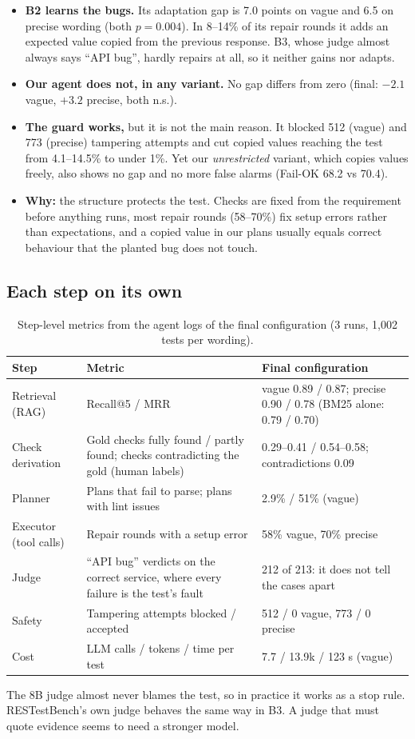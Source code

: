 \documentclass[11pt,a4paper]{article}
\begin{document}
\begin{itemize}
\item \textbf{B2 learns the bugs.} Its adaptation gap is 7.0 points on vague and 6.5 on precise wording (both $p=0.004$). In 8--14\% of its repair rounds it adds an expected value copied from the previous response. B3, whose judge almost always says ``API bug'', hardly repairs at all, so it neither gains nor adapts.
\item \textbf{Our agent does not, in any variant.} No gap differs from zero (final: $-2.1$ vague, $+3.2$ precise, both n.s.).
\item \textbf{The guard works,} but it is not the main reason. It blocked 512 (vague) and 773 (precise) tampering attempts and cut copied values reaching the test from 4.1--14.5\% to under 1\%. Yet our \emph{unrestricted} variant, which copies values freely, also shows no gap and no more false alarms (Fail-OK 68.2 vs 70.4).
\item \textbf{Why:} the structure protects the test. Checks are fixed from the requirement before anything runs, most repair rounds (58--70\%) fix setup errors rather than expectations, and a copied value in our plans usually equals correct behaviour that the planted bug does not touch.
\end{itemize}

\subsection{Each step on its own}
\begin{table}[H]\centering\small
\begin{tabularx}{\linewidth}{@{}P{3.0cm}LP{4.6cm}@{}}\toprule
Step & Metric & Final configuration\\\midrule
Retrieval (RAG) & Recall@5 / MRR & vague 0.89 / 0.87; precise 0.90 / 0.78 (BM25 alone: 0.79 / 0.70)\\
Check derivation & Gold checks fully found / partly found; checks contradicting the gold (human labels) & 0.29--0.41 / 0.54--0.58; contradictions 0.09\\
Planner & Plans that fail to parse; plans with lint issues & 2.9\% / 51\% (vague)\\
Executor (tool calls) & Repair rounds with a setup error & 58\% vague, 70\% precise\\
Judge & ``API bug'' verdicts on the correct service, where every failure is the test's fault & 212 of 213: it does not tell the cases apart\\
Safety & Tampering attempts blocked / accepted & 512 / 0 vague, 773 / 0 precise\\
Cost & LLM calls / tokens / time per test & 7.7 / 13.9k / 123 s (vague)\\
\bottomrule\end{tabularx}
\caption{Step-level metrics from the agent logs of the final configuration (3 runs, 1{,}002 tests per wording).}
\label{tab:steps}
\end{table}
The 8B judge almost never blames the test, so in practice it works as a stop rule. RESTestBench's own judge behaves the same way in B3. A judge that must quote evidence seems to need a stronger model.
\end{document}
